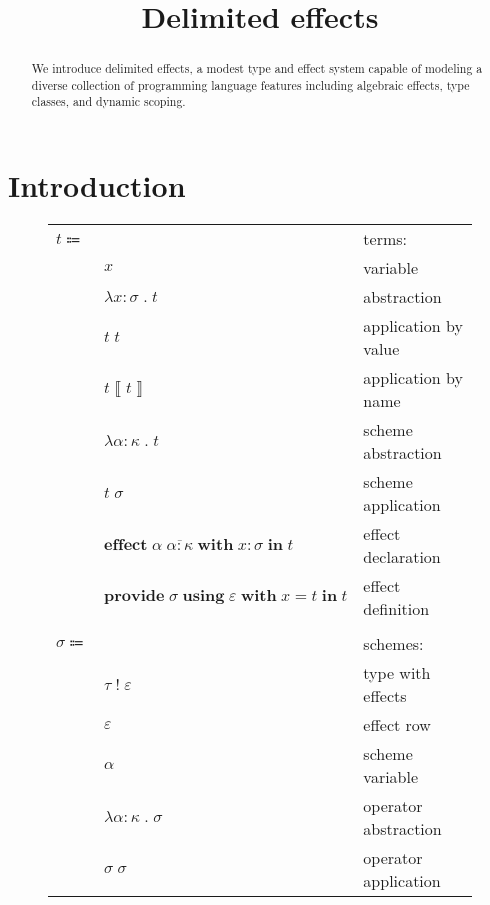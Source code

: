 \documentclass[12pt]{article}
\title{Delimited effects}
\date{}
\newcommand\anno[2]{#1 : #2} %
\newcommand\lstof[1]{\overline{#1}}
\newcommand\eterm{t}
\newcommand\evar{x}
\newcommand\eabs[2]{\lambda #1 \; . \; #2} %
\newcommand\eappxr[2]{#1 \; #2}
\newcommand\eappxp[2]{#1 \left\llbracket #2 \right\rrbracket} %
\newcommand\esabs[2]{\lambda #1 \; . \; #2} %
\newcommand\esapp[2]{#1 \; #2}
\newcommand\eeffect[5]{\textbf{effect} \; #1 \; #2 \; \textbf{with} \; \anno{#3}{#4} \; \textbf{in} \; #5}
\newcommand\eprovide[5]{\textbf{provide} \; #1 \; \textbf{using} \; #2 \; \textbf{with} \; #3 = #4 \; \textbf{in} \; #5}
\newcommand\sscheme{\sigma}
\newcommand\stwithx[2]{#1 \; ! \; #2} %
\newcommand\svar{\alpha}
\newcommand\sabs[2]{\lambda #1 \; . \; #2} %
\newcommand\sapp[2]{#1 \; #2} %
\newcommand\ttype{\tau}
\newcommand\rrow{\varepsilon}
\newcommand\kkind{\kappa}
\begin{document}
  \maketitle

  \begin{abstract}
    We introduce delimited effects, a modest type and effect system capable of modeling a diverse collection of programming language features including algebraic effects, type classes, and dynamic scoping.
  \end{abstract}

  \section{Introduction}

  \begin{figure}
    \begin{mdframed}[backgroundcolor=none]
      \begin{center}
        \begin{tabular}{l l l}
          $\eterm \Coloneqq $ & & terms: \\
          & $\evar$ & variable \\
          & $\eabs{\anno{\evar}{\sscheme}}{\eterm}$ & abstraction \\
          & $\eappxr{\eterm}{\eterm}$ & application by value \\
          & $\eappxp{\eterm}{\eterm}$ & application by name \\
          & $\esabs{\anno{\svar}{\kkind}}{\eterm}$ & scheme abstraction \\
          & $\esapp{\eterm}{\sscheme}$ & scheme application \\
          & $\eeffect{\svar}{\lstof{\anno{\svar}{\kkind}}}{\evar}{\sscheme}{\eterm}$ & effect declaration \\
          & $\eprovide{\sscheme}{\rrow}{\evar}{\eterm}{\eterm}$ & effect definition \\
          \\
          $\sscheme \Coloneqq$ & & schemes: \\
          & $\stwithx{\ttype}{\rrow}$ & type with effects \\
          & $\rrow$ & effect row \\
          & $\svar$ & scheme variable \\
          & $\sabs{\anno{\svar}{\kkind}}{\sscheme}$ & operator abstraction \\
          & $\sapp{\sscheme}{\sscheme}$ & operator application \\

\end{tabular}
\end{center}
\end{mdframed}
\end{figure}
\end{document}
